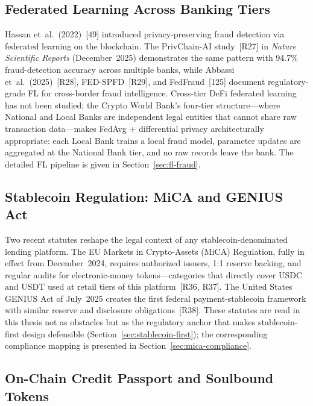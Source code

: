 \documentclass[12pt,a4paper]{report}
\begin{document}
\subsection{Federated Learning Across Banking Tiers}
\label{sec:lit-fl}

Hassan et~al.~(2022)~[49] introduced privacy-preserving fraud detection via federated learning on the blockchain. The PrivChain-AI study~[R27] in \textit{Nature Scientific Reports} (December~2025) demonstrates the same pattern with 94.7\% fraud-detection accuracy across multiple banks, while Abbassi et~al.~(2025)~[R28], FED-SPFD~[R29], and FedFraud~[125] document regulatory-grade FL for cross-border fraud intelligence. Cross-tier DeFi federated learning has not been studied; the Crypto World Bank's four-tier structure---where National and Local Banks are independent legal entities that cannot share raw transaction data---makes FedAvg + differential privacy architecturally appropriate: each Local Bank trains a local fraud model, parameter updates are aggregated at the National Bank tier, and no raw records leave the bank. The detailed FL pipeline is given in Section~\ref{sec:fl-fraud}.

\subsection{Stablecoin Regulation: MiCA and GENIUS Act}
\label{sec:lit-stablecoin-reg}

Two recent statutes reshape the legal context of any stablecoin-denominated lending platform. The EU Markets in Crypto-Assets (MiCA) Regulation, fully in effect from December~2024, requires authorized issuers, 1{:}1 reserve backing, and regular audits for electronic-money tokens---categories that directly cover USDC and USDT used at retail tiers of this platform~[R36, R37]. The United States GENIUS Act of July~2025 creates the first federal payment-stablecoin framework with similar reserve and disclosure obligations~[R38]. These statutes are read in this thesis not as obstacles but as the regulatory anchor that makes stablecoin-first design defensible (Section~\ref{sec:stablecoin-first}); the corresponding compliance mapping is presented in Section~\ref{sec:mica-compliance}.

\subsection{On-Chain Credit Passport and Soulbound Tokens}
\label{sec:lit-sbt}
\end{document}
